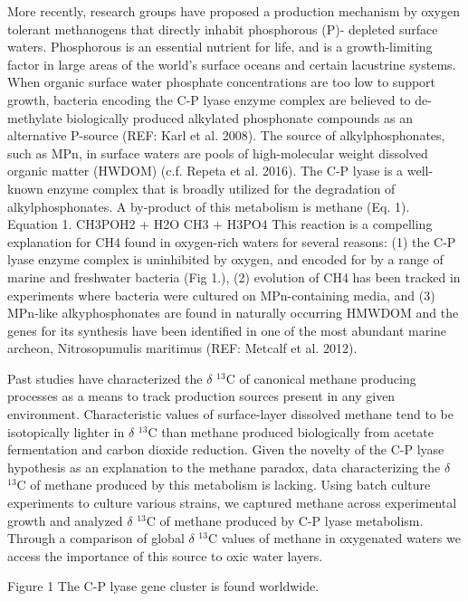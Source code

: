 \documentclass{nature}
\begin{document}
More recently, research groups have proposed a production mechanism by oxygen tolerant methanogens that directly inhabit phosphorous (P)- depleted surface waters. Phosphorous is an essential nutrient for life, and is a growth-limiting factor in large areas of the world's surface oceans and certain lacustrine systems. When organic surface water phosphate concentrations are too low to support growth, bacteria encoding the C-P lyase enzyme complex are believed to de-methylate biologically produced alkylated phosphonate compounds as an alternative P-source (REF: Karl et al. 2008). The source of alkylphosphonates, such as MPn, in surface waters are pools of high-molecular weight dissolved organic matter (HWDOM) (c.f. Repeta et al. 2016). The C-P lyase is a well-known enzyme complex that is broadly utilized for the degradation of alkylphosphonates. A by-product of this metabolism is methane (Eq. 1). 
Equation 1. CH3POH2 + H2O  CH3 + H3PO4
This reaction is a compelling explanation for CH4  found in oxygen-rich waters for several reasons: (1) the C-P lyase enzyme complex is uninhibited by oxygen, and encoded for by a range of marine and freshwater bacteria (Fig 1.), (2) evolution of CH4 has been tracked in experiments where bacteria were cultured on MPn-containing media, and (3) MPn-like alkyphosphonates are found in naturally occurring HMWDOM and the genes for its synthesis have been identified in one of the most abundant marine archeon, Nitrosopumulis maritimus (REF: Metcalf et al. 2012). 

Past studies have characterized the $\delta$ $^13$C of canonical methane producing processes as a means to track production sources present in any given environment. Characteristic values of surface-layer dissolved methane tend to be isotopically lighter in $\delta$ $^13$C than methane produced biologically from acetate fermentation and carbon dioxide reduction. Given the novelty of the C-P lyase hypothesis as an explanation to the methane paradox, data characterizing the $\delta$ $^13$C of methane produced by this metabolism is lacking.  Using batch culture experiments to culture various strains, we captured methane across experimental growth and analyzed $\delta$ $^13$C of methane produced by C-P lyase metabolism. Through a comparison of global $\delta$ $^13$C values of methane in oxygenated waters we access the importance of this source to oxic water layers. 

Figure 1 The C-P lyase gene cluster is found worldwide.
\end{document}
